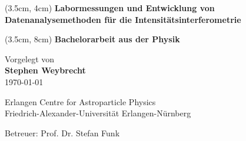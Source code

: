 
\begin{center}

    \vspace*{3cm}
 
    \begin{textblock*}{15 cm}(3.5cm, 4cm)
        \Large \bf{Labormessungen und Entwicklung von Datenanalysemethoden für die Intensitätsinterferometrie}
    \end{textblock*}

    \begin{textblock*}{15 cm}(3.5cm, 8cm)
        \bf{Bachelorarbeit aus der Physik}
    \end{textblock*}

    \vspace{4cm}
    
    \vspace{1.2cm}
            Vorgelegt von\\
            {\bf Stephen Weybrecht} \\
            \today

    \vspace*{2.5 cm}
    Erlangen Centre for Astroparticle Physics\\
    Friedrich-Alexander-Universität Erlangen-Nürnberg
    \vspace*{1 cm}

    \vspace*{6 cm}
    Betreuer: Prof. Dr. Stefan Funk
    \vspace*{1 cm}

\end{center}
